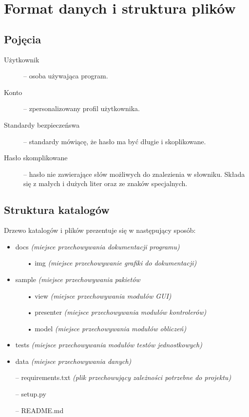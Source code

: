 \documentclass[a4paper]{article}
\begin{document}
\section{Format danych i struktura plików}

\subsection{Pojęcia}
\begin{description}
    \item[Użytkownik]-- osoba używająca program.
    \item[Konto]-- zpersonalizowany profil użytkownika.
    \item[Standardy bezpieczeńswa]-- standardy mówiącę, że hasło ma być długie i skoplikowane.
    \item[Hasło skomplikowane]-- hasło nie zawierające słów możliwych do znalezienia w słowniku. Składa się z małych i dużych liter oraz ze znaków specjalnych.
\end{description}

\subsection{Struktura katalogów}
Drzewo katalogów i plików prezentuje się w następujący sposób:
\begin{itemize}
    \item docs \textit{(miejsce przechowywania dokumentacji programu)}
    \begin{itemize}
        \item[•] img \textit{(miejsce przechowywanie grafiki do dokumentacji)}
    \end{itemize}
    \item sample \textit{(miejsce przechowywania pakietów}
    \begin{itemize}
        \item[•] view \textit{(miejsce przechowywania modułów GUI)}
        \item[•] presenter \textit{(miejsce przechowywania modułów kontrolerów)}
        \item[•] model \textit{(miejsce przechowywania modułów obliczeń)}
    \end{itemize}
    \item tests \textit{(miejsce przechowywania modułów testów jednostkowych)}
    \item data \textit{(miejsce przechowywania danych)}
    \item[--] requirements.txt \textit{(plik przechowujący zależności potrzebne do projektu)}
    \item[--] setup.py
    \item[--] README.md
\end{itemize}
\end{document}

